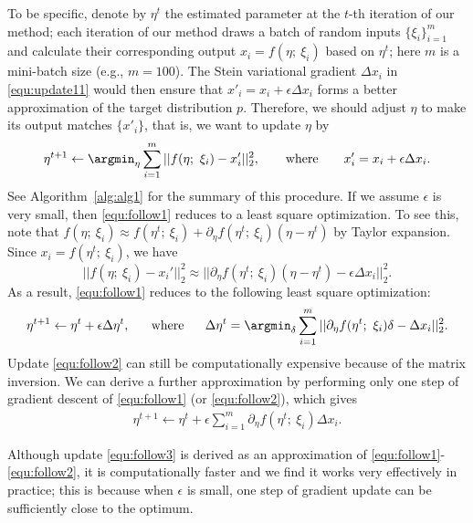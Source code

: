 \documentclass{article} \usepackage{iclr2017_conference,times}
\begin{document}
To be specific, denote by $\eta^t$ the estimated parameter at the $t$-th iteration of our method; 
each iteration of our method 
draws a batch of random inputs $\{\xi_i\}_{i=1}^m$ 
and calculate their corresponding output $x_i = f(\eta;~\xi_i)$ based on $\eta^t$; here $m$ is a mini-batch size (e.g., $m=100$). 
The Stein variational gradient $\Delta x_i$ in 
\eqref{equ:update11} would then ensure that $x'_i = x_i + \epsilon \Delta x_i$ forms a better approximation of the target distribution $p$. 
Therefore, we should adjust $\eta$ to make its output matches $\{x'_i\}$, 
that is, we want to update $\eta$ by
\begin{align}\label{equ:follow1}
\eta^{t+1} \gets  \argmin_\eta  \sum_{i=1}^m ||  f(\eta;~\xi_i)  - x_i' ||_2^2,  ~~~~~~ \text{where} ~~~~~~  x_i'  = x_i  + \epsilon \Delta x_i. 
\end{align}
See Algorithm~\ref{alg:alg1} for the summary of this procedure. If we assume $\epsilon$ is very small, then 
\eqref{equ:follow1} reduces to a least square optimization. To see this, note that 
$f(\eta;~\xi_i) \approx f(\eta^t;~\xi_i) + \partial_\eta f(\eta^t;~\xi_i) (\eta - \eta^t)$ by Taylor expansion. 
Since $x_i = f(\eta^t;~\xi_i)$, we have
$$
 ||  f(\eta;~\xi_i)  - x_i' ||_2^2 \approx || \partial_\eta f(\eta^t;~\xi_i) (\eta  - \eta^t)  - \epsilon \Delta x_i  ||_2^2. 
$$
As a result, \eqref{equ:follow1} reduces to the following least square optimization: 
\begin{align}\label{equ:follow2}
\eta^{t+1} \gets \eta^t + \epsilon \Delta \eta^t, 
\text{~~~~~where~~~~~}
\Delta \eta^t = \argmin_{\delta}  \sum_{i=1}^m   || \partial_\eta f(\eta^t;~\xi_i)  \delta   -  \Delta x_i  ||_2^2. 
\end{align}
Update \eqref{equ:follow2} can still be computationally expensive because of the matrix inversion. 
We can derive a further approximation by performing only one step of gradient descent of \eqref{equ:follow1} (or \eqref{equ:follow2}), which gives 
\begin{align}\label{equ:follow3}
\eta^{t+1} \gets \eta^t + \epsilon  \sum_{i=1}^m   \partial_\eta f(\eta^t;~\xi_i) \Delta x_i. 
\end{align}





Although update \eqref{equ:follow3} is derived as an approximation of \eqref{equ:follow1}-\eqref{equ:follow2}, 
it is computationally faster and we find it works very effectively in practice; 
this is because when $\epsilon$ is small, 
one step of gradient update can be sufficiently close to the optimum.  
\end{document}
